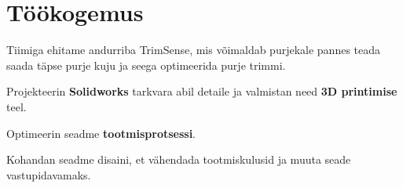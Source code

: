 \documentclass[letterpaper]{deedy-resume} %
\begin{document}
%
\begin{minipage}[t]{0.66\textwidth} %


\section{Töökogemus}

%
%



\vspace{\topsep} %
\begin{tightitemize}
  \item Tiimiga ehitame andurriba TrimSense, mis võimaldab purjekale pannes teada saada täpse purje kuju ja seega optimeerida purje trimmi.
  \item Projekteerin \textbf{Solidworks} tarkvara abil detaile ja valmistan need \textbf{3D printimise} teel.
  \item Optimeerin seadme \textbf{tootmisprotsessi}.
  \item Kohandan seadme disaini, et vähendada tootmiskulusid ja muuta seade vastupidavamaks.
\end{tightitemize}


\end{minipage}
\end{document}
